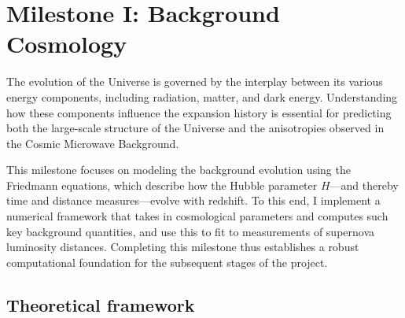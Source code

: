\documentclass{aa}
\numberwithin{equation}{section}
\numberwithin{table}{section}
\numberwithin{figure}{section}
\begin{document}
\section{Milestone I: Background Cosmology}\label{sec: milestone I}


The evolution of the Universe is governed by the interplay between its various energy components, including radiation, matter, and dark energy. Understanding how these components influence the expansion history is essential for predicting both the large-scale structure of the Universe and the anisotropies observed in the Cosmic Microwave Background. 

This milestone focuses on modeling the background evolution using the Friedmann equations, which describe how the Hubble parameter $H$—and thereby time and distance measures—evolve with redshift. To this end, I implement a numerical framework that takes in cosmological parameters and computes such key background quantities, and use this to fit to measurements of supernova luminosity distances. Completing this milestone thus establishes a robust computational foundation for the subsequent stages of the project.


\subsection{Theoretical framework}\label{subsec: I theory}
\end{document}
